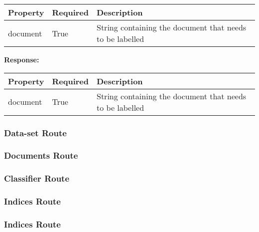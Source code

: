 \begin{enumerate}
\begin{tabular}{ | l | l | l |}
\hline
Property & Required & Description\\ \hline
document & True & String containing the document that needs to be labelled\\ \hline
\end{tabular}

\textbf{Response:}
\newline
\newline
\begin{tabular}{ | l | l | l |}
\hline
Property & Required & Description\\ \hline
document & True & String containing the document that needs to be labelled\\ \hline
\end{tabular}

\end{enumerate}



\subsubsection{Data-set Route}
\subsubsection{Documents Route}
\subsubsection{Classifier Route}
\subsubsection{Indices Route}
\subsubsection{Indices Route}